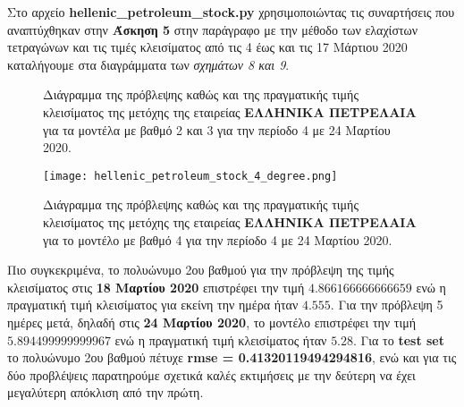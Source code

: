 \documentclass[Second Project.tex]{subfiles}
\begin{document}
Στο αρχείο \textlatin{\textbf{hellenic\_petroleum\_stock.py}} χρησιμοποιώντας τις συναρτήσεις που αναπτύχθηκαν στην 
\textbf{Άσκηση 5} στην παράγραφο με την μέθοδο των ελαχίστων τετραγώνων και τις τιμές κλεισίματος από τις 4 έως 
και τις 17 Μάρτιου 2020 καταλήγουμε στα διαγράμματα των \textit{σχημάτων 8 και 9}.
\begin{figure}[h!]
    \centering
    \captionsetup{justification=centering}
    \quad
    \caption{ Διάγραμμα της πρόβλεψης καθώς και της πραγματικής τιμής κλεισίματος της μετόχης της εταιρείας 
    \textbf{ΕΛΛΗΝΙΚΑ ΠΕΤΡΕΛΑΙΑ} για τα μοντέλα με βαθμό 2 και 3 για την περίοδο 4 με 24 Μαρτίου 2020. }
\end{figure}
\vspace{10px}
\begin{figure}[h!]
    \centering
    \captionsetup{justification=centering}
    \begin{center}
        \texttt{[image: hellenic\_petroleum\_stock\_4\_degree.png]}    
        \caption{Διάγραμμα της πρόβλεψης καθώς και της πραγματικής τιμής κλεισίματος της μετόχης της εταιρείας 
        \textbf{ΕΛΛΗΝΙΚΑ ΠΕΤΡΕΛΑΙΑ} για το μοντέλο με βαθμό 4 για την περίοδο 4 με 24 Μαρτίου 2020.}
    \end{center}
\end{figure}

Πιο συγκεκριμένα, το πολυώνυμο 2ου βαθμού για την πρόβλεψη της τιμής κλεισίματος στις \textbf{18 Μαρτίου 2020} 
επιστρέφει την τιμή $4.866166666666659$ ενώ η πραγματική τιμή κλεισίματος για εκείνη την ημέρα ήταν
$4.555$. Για την πρόβλεψη 5 ημέρες μετά, δηλαδή στις \textbf{24 Μαρτίου 2020}, το μοντέλο επιστρέφει την τιμή 
$5.894499999999967$ ενώ η πραγματική τιμή κλεισίματος ήταν $5.28$. Για το \textlatin{\textbf{test set}} το
πολυώνυμο 2ου βαθμού πέτυχε \textbf{\textlatin{rmse} = 0.41320119494294816}, ενώ και για τις δύο προβλέψεις 
παρατηρούμε σχετικά καλές εκτιμήσεις με την δεύτερη να έχει μεγαλύτερη απόκλιση από την πρώτη. 
\end{document}
